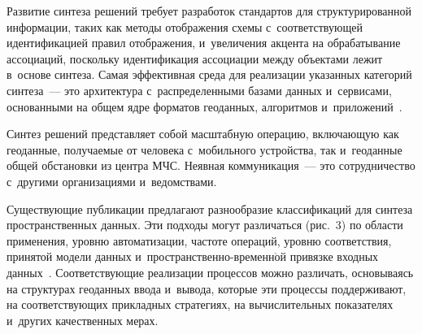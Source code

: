 \begin{multicols}{2}
     Развитие синтеза решений требует разработок стандартов для 
структурированной информации, таких как методы отображения схемы 
с~соответствующей идентификацией правил отображения, и~увеличения 
акцента на обрабатывание ассоциаций, поскольку идентификация ассоциации 
между объектами лежит в~основе синтеза. Самая эффективная среда для 
реализации указанных категорий синтеза~--- это архитектура с~распределенными 
базами данных и~сервисами, основанными на общем ядре форматов геоданных, 
алгоритмов и~приложений~\cite{8-dul}. 
     
     Синтез решений представляет собой масштабную операцию, 
включающую как геоданные, получаемые от человека с~мобильного устройства, 
так и~геоданные общей обстановки из центра МЧС. Неявная коммуникация~--- 
это сотрудничество с~другими организациями и~ведомствами.
     
     Существующие публикации предлагают разнообразие классификаций для 
синтеза пространственных данных. Эти подходы могут различаться (рис.~3) по 
области применения, уровню автоматизации, частоте операций, уровню 
соответствия, принятой модели данных и~про\-стран\-ст\-вен\-но-вре\-мен\-н$\acute{\mbox{о}}$й 
привязке входных данных~\cite{2-dul}. Соответствующие реализации процессов 
можно различать, основываясь на структурах геоданных ввода и~вывода, 
которые эти процессы поддерживают, на соответствующих прикладных 
стратегиях, на вычислительных показателях и~других качественных мерах.




\end{multicols}
